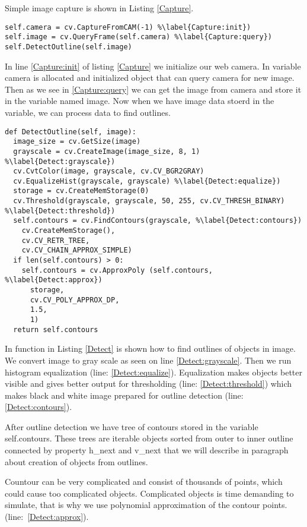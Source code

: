 \documentclass{ifacconf}
\begin{document}
Simple image capture is shown in Listing \ref{Capture}.
\begin{lstlisting}[caption=Query image frame from web camera, label=Capture]
self.camera = cv.CaptureFromCAM(-1) %\label{Capture:init})
self.image = cv.QueryFrame(self.camera) %\label{Capture:query})
self.DetectOutline(self.image)
\end{lstlisting}
In line \ref{Capture:init} of listing \ref{Capture} we initialize our web
camera. In variable camera is allocated and initialized object that can query
camera for new image. Then as we see in \ref{Capture:query} we can get the
image from camera and store it in the variable named image. Now when we have
image data stoerd in the variable, we can process data to find outlines.
\begin{lstlisting}[caption=Outline detection, label=Detect]
def DetectOutline(self, image):
  image_size = cv.GetSize(image)
  grayscale = cv.CreateImage(image_size, 8, 1)	%\label{Detect:grayscale})
  cv.CvtColor(image, grayscale, cv.CV_BGR2GRAY)
  cv.EqualizeHist(grayscale, grayscale)	%\label{Detect:equalize})
  storage = cv.CreateMemStorage(0)
  cv.Threshold(grayscale, grayscale, 50, 255, cv.CV_THRESH_BINARY) %\label{Detect:threshold})
  self.contours = cv.FindContours(grayscale, %\label{Detect:contours})
    cv.CreateMemStorage(),
    cv.CV_RETR_TREE,
    cv.CV_CHAIN_APPROX_SIMPLE)
  if len(self.contours) > 0:
    self.contours = cv.ApproxPoly (self.contours, %\label{Detect:approx})
      storage,
      cv.CV_POLY_APPROX_DP,
      1.5,
      1)
  return self.contours
\end{lstlisting}
In function in Listing \ref{Detect} is shown how to find outlines of objects in
image. We convert image to gray scale as seen on line \ref{Detect:grayscale}.
Then we run histogram equalization (line: \ref{Detect:equalize}).
Equalization makes objects better visible and gives better output for
thresholding (line: \ref{Detect:threshold}) which makes black and white image
prepared for outline detection (line: \ref{Detect:contours}).

After outline detection we have tree of contours stored in the variable
self.contours. These trees are iterable objects sorted from outer to inner
outline connected by property h\_next and v\_next that we will describe in
paragraph about creation of objects from outlines.

Countour can be very complicated and consist of thousands of points, which could
cause too complicated objects. Complicated objects is time demanding to
simulate, that is why we use polynomial approximation of the contour points.
(line:~\ref{Detect:approx}).
\end{document}
